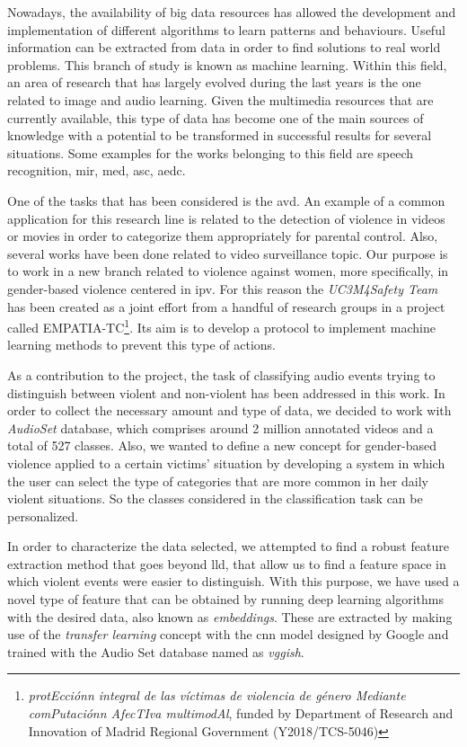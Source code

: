 	Nowadays, the availability of big data resources has allowed the development and implementation of different algorithms to learn patterns and behaviours. Useful information can be extracted from data in order to find solutions to real world problems. This branch of study is known as machine learning. Within this field, an area of research that has largely evolved during the last years is the one related to image and audio learning. Given the multimedia resources that are currently available, this type of data has become one of the main sources of knowledge with a potential to be transformed in successful results for several situations. Some examples for the works belonging to this field are speech recognition, \acrfull{mir}, \acrfull{med}, \acrfull{asc}, \acrfull{aedc}.
	
	One of the tasks that has been considered is the \acrfull{avd}. An example of a common application for this research line is related to the detection of violence in videos or movies in order to categorize them appropriately for parental control. Also, several works have been done related to video surveillance topic. Our purpose is to work in a new branch related to violence against women, more specifically, in gender-based violence centered in \acrfull{ipv}. For this reason the \textit{UC3M4Safety Team} has been created as a joint effort from a handful of research groups in a project called EMPATIA-TC\footnote{\textit{protEcciónn integral de las víctimas de violencia de género Mediante comPutaciónn AfecTIva multimodAl}, funded by Department  of  Research  and Innovation of Madrid Regional Government (Y2018/TCS-5046)}. Its aim is %
	to develop a protocol to implement machine learning methods to prevent this type of actions. 
	
	As a contribution to the project, the task of classifying audio events trying to distinguish between violent and non-violent has been addressed in this work. In order to collect the necessary amount and type of data, we decided to work with \textit{AudioSet} database, which comprises around 2 million annotated videos and a total of 527 classes. Also, we wanted to define a new concept for gender-based violence applied to a certain victims' situation by developing a system in which the user can select the type of categories that are more common in her daily violent situations. So the classes considered in the classification task can be personalized. 
	
	In order to characterize the data selected, we attempted to find a robust feature extraction method that goes beyond \acrfull{lld}, that allow us to find a feature space in which violent events were easier to distinguish. With this purpose, we have used a novel type of feature that can be obtained by running deep learning algorithms with the desired data, also known as \textit{embeddings}. These are extracted by making use of the \textit{transfer learning} concept with the \acrshort{cnn} model designed by Google and trained with the Audio Set database named as \textit{\acrshort{vgg}ish}.
	
